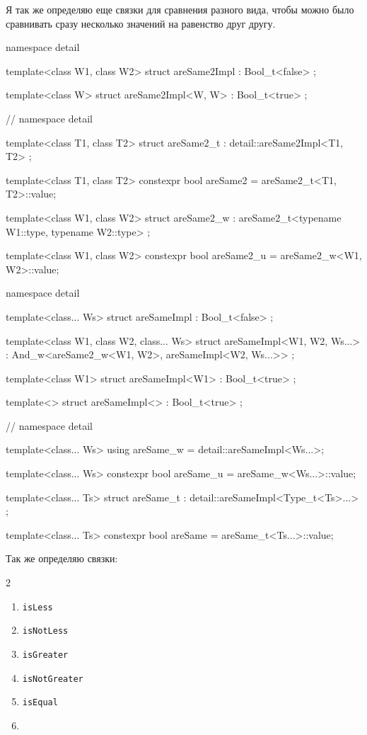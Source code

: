 Я так же определяю еще связки для сравнения разного вида, чтобы можно было сравнивать сразу несколько значений на равенство друг другу.
\begin{cppcode}
namespace detail {
template<class W1, class W2>
struct areSame2Impl : Bool_t<false> {};

template<class W>
struct areSame2Impl<W, W> : Bool_t<true> {};
} // namespace detail

template<class T1, class T2>
struct areSame2_t : detail::areSame2Impl<T1, T2> {};

template<class T1, class T2>
constexpr bool areSame2 = areSame2_t<T1, T2>::value;

template<class W1, class W2>
struct areSame2_w : areSame2_t<typename W1::type, typename W2::type> {};

template<class W1, class W2>
constexpr bool areSame2_u = areSame2_w<W1, W2>::value;

namespace detail {

template<class... Ws>
struct areSameImpl : Bool_t<false> {};

template<class W1, class W2, class... Ws>
struct areSameImpl<W1, W2, Ws...>
    : And_w<areSame2_w<W1, W2>, areSameImpl<W2, Ws...>> {};

template<class W1>
struct areSameImpl<W1> : Bool_t<true> {};

template<>
struct areSameImpl<> : Bool_t<true> {};
} // namespace detail

template<class... Ws>
using areSame_w = detail::areSameImpl<Ws...>;

template<class... Ws>
constexpr bool areSame_u = areSame_w<Ws...>::value;

template<class... Ts>
struct areSame_t : detail::areSameImpl<Type_t<Ts>...> {};

template<class... Ts>
constexpr bool areSame = areSame_t<Ts...>::value;
\end{cppcode}
Так же определяю связки:
\begin{multicols}{2}
\begin{enumerate}
\item \verb"isLess"
\item \verb"isNotLess"
\item \verb"isGreater"
\item \verb"isNotGreater"
\item \verb"isEqual"
\item[]
\end{enumerate}
\end{multicols}
